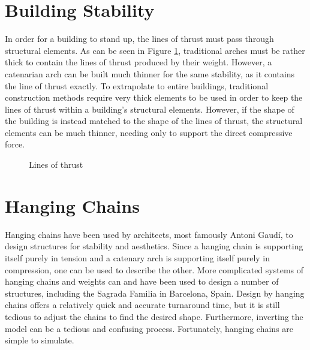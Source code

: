 \documentclass{thesis}
\begin{document}
\section{Building Stability} \label{stability}
In order for a building to stand up, the lines of thrust must pass through structural elements.  As can be seen in Figure \ref{FIGURE_arch_lines},
traditional arches must be rather thick to contain the lines of thrust produced by their weight.  However, a catenarian arch can be built
much thinner for the same stability, as it contains the line of thrust exactly.
To extrapolate to entire buildings, traditional construction methods require very thick elements to be used in order to keep the lines of thrust
within a building's structural elements.  However, if the shape of the building is instead matched to the shape of the lines of thrust, the
structural elements can be much thinner, needing only to support the direct compressive force.
\begin{figure}
\caption{Lines of thrust}
\label{FIGURE_arch_lines}
\end{figure}

\section{Hanging Chains}
Hanging chains have been used by architects, most famously Antoni Gaud\'{i}, to design structures for stability and aesthetics.  Since a hanging
chain is supporting itself purely in tension and a catenary arch is supporting itself purely in compression, one can be used to describe the other.
More complicated systems of hanging chains and weights can and have been used to design a number of structures, including the Sagrada Familia in
Barcelona, Spain.  Design by hanging chains offers a relatively quick and accurate turnaround time, but it is still tedious to adjust the chains
to find the desired shape.  Furthermore, inverting the model can be a tedious and confusing process.  Fortunately, hanging chains are simple to simulate.
\end{document}
